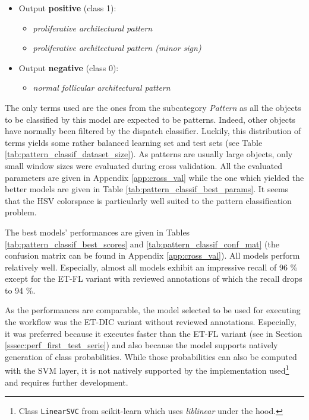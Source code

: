 \begin{itemize}
	\item Output \textbf{positive} (class 1): 
	\begin{itemize}
		\item \textit{proliferative architectural pattern}
		\item \textit{proliferative architectural pattern (minor sign)}
	\end{itemize}
	\item Output \textbf{negative} (class 0): 
	\begin{itemize}
		\item \textit{normal follicular architectural pattern}
	\end{itemize}		
\end{itemize}

The only terms used are the ones from the subcategory \textit{Pattern} as all the objects to be classified by this model are expected to be patterns.  Indeed, other objects have normally been filtered by the dispatch classifier. Luckily, this distribution of terms yields some rather balanced learning set and test sets (see Table \ref{tab:pattern_classif_dataset_size}). As patterns are usually large objects, only small window sizes were evaluated during cross validation. All the evaluated parameters are given in Appendix \ref{app:cross_val} while the one which yielded the better models are given in Table \ref{tab:pattern_classif_best_params}. It seems that the HSV colorspace is particularly well suited to the pattern classification problem. 

The best models' performances are given in Tables \ref{tab:pattern_classif_best_scores} and \ref{tab:pattern_classif_conf_mat} (the confusion matrix can be found in Appendix \ref{app:cross_val}). All models perform relatively well. Especially, almost all models exhibit an impressive recall of 96 \% except for the ET-FL variant with reviewed annotations of which the recall drops to 94 \%.

As the performances are comparable, the model selected to be used for executing the workflow was the ET-DIC variant without reviewed annotations. Especially, it was preferred because it executes faster than the ET-FL variant (see in Section \ref{sssec:perf_first_test_serie}) and also because the model supports natively generation of class probabilities. While those probabilities can also be computed with the SVM layer, it is not natively supported by the implementation used\footnote{Class \texttt{LinearSVC} from scikit-learn which uses \textit{liblinear} \cite{REF08a} under the hood.} and requires further development. 

